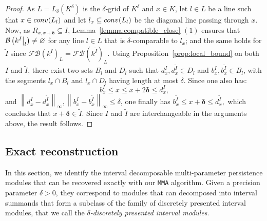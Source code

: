 \documentclass{article}
\newcommand{\field}{k}
\newcommand{\norm}[1]{\left\lVert #1 \right\rVert}
\newcommand{\fibered}[1]{ {\mathcal F}{\mathcal B}(#1) }
\newcommand{\barcode}[1]{ {\mathcal B}\left(#1\right) }
\newcommand{\conv}[1]{ {\rm conv}(#1) }
\newcommand{\induced}[1]{\field^{#1}}
\newcommand{\rectangle}[2]{ R_{#1, #2} }
\newcommand\restr[2]{{  \left.\kern-\nulldelimiterspace #1 \vphantom{\big|} \right|_{#2}  }}
\newcommand{\MMA}{\texttt{MMA}}
\begin{document}
\begin{proof}
	As $L=L_\delta(K^\delta)$ is the $\delta$-grid of $K^\delta$ and $x\in K$, let
	$l\in L$ be a line such that $x\in \conv{L_l}$ and let $l_x \subseteq \conv{L_{l}}$ be the diagonal line passing through $x$.
	Now, as $\rectangle{x}{x + \boldsymbol \delta} \subseteq {I}$, Lemma~\ref{lemma:compatible_close} $(1)$ ensures that $\barcode{\restr{{\induced{I}}}{l}}\neq \varnothing$
	for any line $l\in L$ that is $\delta$-comparable to $l_x$; and the same holds
	for $\tilde I$ since $\fibered{{\field^I}}_L=\fibered{{\induced{\tilde I}}}_L$. %
	Using Proposition~\ref{prop:local_bound} on both $I$ and $\tilde I$, %
	there exist two sets $B_l$ and $D_l$ such that
	$d_x^I, d_x^{\tilde I} \in D_l$ and $b_x^I, b_x^{\tilde I} \in B_l$,
	with the segments $l_x \cap B_l$ and $l_x \cap D_l$ having length at most $\delta$. %
	Since one also has: %
	\begin{equation*}
		b_x^I \le x \le x+ 2\boldsymbol \delta \le d_x^I,
	\end{equation*}
	and $ \norm{ d_x^I - d_x^{\tilde I}}_\infty, \norm{ b_x^I - b_x^{\tilde I}}_\infty \le \delta$, one finally has
	$
	b_x^{\tilde I} \le x+ \boldsymbol \delta \le d_{x}^{\tilde I},
	$
	which concludes that $x + \boldsymbol \delta \in {\tilde I}$.
	Since $I$ and $\tilde I$ are interchangeable in the arguments above, the result follows.
\end{proof}

\subsection{Exact reconstruction}\label{subsec:exact}


In this section, we identify the interval decomposable multi-parameter persistence modules that can be recovered
exactly with our \MMA{} algorithm.
Given a precision parameter $\delta > 0$, they correspond to modules that can decomposed into interval summands %
that form a subclass of the family of discretely presented interval modules,
that we call the {\em $\delta$-discretely presented interval modules}. \\
\end{document}
